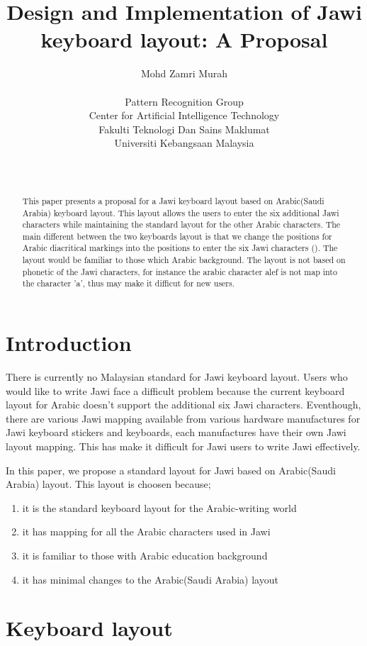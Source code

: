 \documentclass[12pt,a4paper]{IEEEconf}
\author{Mohd Zamri Murah\\
\begin{affiliation}Pattern Recognition Group\\
Center for Artificial Intelligence Technology\\
Fakulti Teknologi Dan Sains Maklumat\\
Universiti Kebangsaan Malaysia\\
\end{affiliation}\\
\email{zamri@ftsm.ukm.my}}
\title{Design and Implementation of Jawi
keyboard layout: A Proposal}
\date{}
\begin{document}
\maketitle

\begin{abstract}
This paper presents a proposal for a Jawi keyboard layout based on Arabic(Saudi Arabia) keyboard layout. This layout allows the users to enter the six additional Jawi characters while maintaining the standard layout for the other Arabic characters. The main different between the two keyboards layout is that we change the positions for Arabic diacritical markings  into the positions to enter the six Jawi characters (). The layout would be familiar to those which Arabic background. The layout is not based on phonetic of the Jawi characters, for instance the arabic character alef  is not map into the character 'a', thus may make it difficut for new users.
\end{abstract}

\section{Introduction}

There is currently no Malaysian standard for Jawi keyboard layout. Users who would like to write Jawi  face a difficult problem  because the current keyboard layout for Arabic doesn't support the additional six Jawi characters. Eventhough, there are various Jawi mapping available from various hardware manufactures for Jawi keyboard stickers and keyboards, each manufactures have their own Jawi layout mapping. This has make it difficult for Jawi users to write Jawi effectively.

In  this paper, we propose a standard layout for Jawi based on Arabic(Saudi Arabia) layout. This layout is choosen because;
\begin{enumerate}
\item it is the standard keyboard layout for the Arabic-writing world
\item it has mapping for all the Arabic characters used in Jawi
\item it is familiar to those with Arabic education background
\item it has minimal changes to the Arabic(Saudi Arabia) layout
\end{enumerate}
\section{Keyboard layout}
\end{document}
